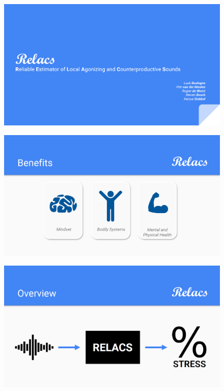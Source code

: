 \documentclass[a4paper]{article}
\begin{document}
\begin{figure}[h]
\centering
\includegraphics[width=\linewidth]{./Slide3}
\label{fig:Slide3}
\end{figure}

\begin{figure}[h]
\centering
\includegraphics[width=\linewidth]{./Slide4}
\label{fig:Slide4}
\end{figure}

\begin{figure}[h]
\centering
\includegraphics[width=\linewidth]{./Slide5}
\label{fig:Slide5}
\end{figure}
\end{document}
